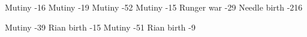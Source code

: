 \newcommand{\Risvet}           {Risvet\xspace}%

\newcommand{\Minister}         {Minister\xspace} %
\newcommand{\minister}         {minister\xspace}

\newcommand{\WimarNorden}      {Wulfwin Norden\xspace} %

\newcommand{\Kintaer}          {Kintaer\xspace} %
\newcommand{\Theal}            {Th\"eal\xspace} %
\newcommand{\Constance}        {Elfrin\xspace}  %


\begin{comment}
\subsubsection{Commoners in Malcur}
\end{comment}


\newcommand{\Urban}     {Urban\xspace}     %
\newcommand{\Brittany}  {\Piacet}          %
\newcommand{\Piacet}    {Pia\c cet\xspace}

\newcommand{\Bryon}     {Br\ydiphthong on\xspace} %
\newcommand{\Mya}       {M\ydiphthong a\xspace}   %
\newcommand{\Uswa}      {Uswa\xspace}             %

             {Mutiny}      {-16}
          {Mutiny}      {-19}
  {Mutiny}      {-52}
            {Mutiny}      {-15}
           {Runger war}  {-29}
            {Needle birth}{ -2}{16}

        {Mutiny}      {-39}
          {Rian birth}  {-15}
             {Mutiny}      {-51}
           {Rian birth}  {-9}

\begin{comment}
\subsubsection{In Redglen}
\end{comment}

\begin{comment}
\paragraph{Shireyo household}
\end{comment}

